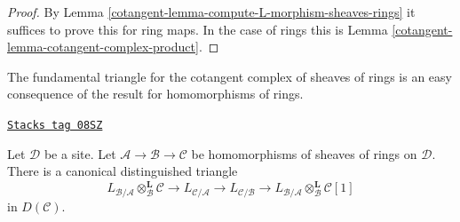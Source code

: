 \begin{proof}

By Lemma \ref{cotangent-lemma-compute-L-morphism-sheaves-rings}
it suffices to prove this for ring maps.
In the case of rings this is
Lemma \ref{cotangent-lemma-cotangent-complex-product}.
\end{proof}

The fundamental triangle for the cotangent complex of sheaves of rings
is an easy consequence of the result for homomorphisms of rings.

\begin{lemma}
\label{cotangent-lemma-triangle-sheaves-rings}
\href{https://stacks.math.columbia.edu/tag/08SZ}{\texttt{Stacks tag 08SZ}}

Let $\mathcal{D}$ be a site. Let $\mathcal{A} \to \mathcal{B} \to \mathcal{C}$
be homomorphisms of sheaves of rings on $\mathcal{D}$.
There is a canonical distinguished triangle
$$
L_{\mathcal{B}/\mathcal{A}} \otimes_\mathcal{B}^\mathbf{L} \mathcal{C}
\to L_{\mathcal{C}/\mathcal{A}} \to L_{\mathcal{C}/\mathcal{B}} \to
L_{\mathcal{B}/\mathcal{A}} \otimes_\mathcal{B}^\mathbf{L} \mathcal{C}[1]
$$
in $D(\mathcal{C})$.
\end{lemma}

